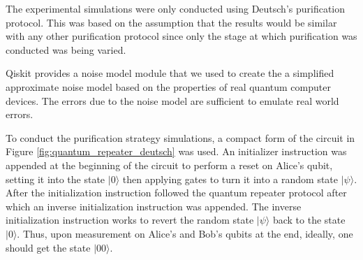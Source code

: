 \documentclass[11pt]{article}
\begin{document}
The experimental simulations were only conducted using Deutsch's purification protocol. This was based on the assumption that the results would be similar with any other purification protocol since only the stage at which purification was conducted was being varied.

Qiskit provides a noise model module that we used to create the a simplified approximate noise model based on the properties of real quantum computer devices. The errors due to the noise model are sufficient to emulate real world errors.

To conduct the purification strategy simulations, a compact form of the circuit in Figure \ref{fig:quantum_repeater_deutsch} was used. An initializer instruction was appended at the beginning of the circuit to perform a reset on Alice's qubit, setting it into the state $|0\rangle$ then applying gates to turn it into a random state $|\psi\rangle$. After the initialization instruction followed the quantum repeater protocol after which an inverse initialization instruction was appended. The inverse initialization instruction works to revert the random state $|\psi\rangle$ back to the state $|0\rangle$. Thus, upon measurement on Alice's and Bob's qubits at the end, ideally, one should get the state $|00\rangle$.
\end{document}
